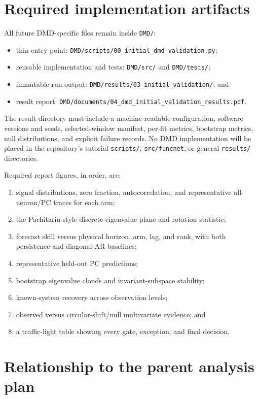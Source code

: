 \documentclass[11pt,a4paper]{article}
\begin{document}
\section{Required implementation artifacts}

All future DMD-specific files remain inside \texttt{DMD/}:

\begin{itemize}
  \item thin entry point: \texttt{DMD/scripts/00\_initial\_dmd\_validation.py};
  \item reusable implementation and tests: \texttt{DMD/src/} and
  \texttt{DMD/tests/};
  \item immutable run output: \texttt{DMD/results/03\_initial\_validation/}; and
  \item result report: \texttt{DMD/documents/04\_dmd\_initial\_validation\_results.pdf}.
\end{itemize}

The result directory must include a machine-readable configuration, software
versions and seeds, selected-window manifest, per-fit metrics, bootstrap metrics,
null distributions, and explicit failure records. No DMD implementation will be
placed in the repository's tutorial \texttt{scripts/}, \texttt{src/funcnet}, or
general \texttt{results/} directories.

Required report figures, in order, are:

\begin{enumerate}
  \item signal distributions, zero fraction, autocorrelation, and representative
  all-neuron/PC traces for each arm;
  \item the Pachitariu-style discrete-eigenvalue plane and rotation statistic;
  \item forecast skill versus physical horizon, arm, lag, and rank, with both
  persistence and diagonal-AR baselines;
  \item representative held-out PC predictions;
  \item bootstrap eigenvalue clouds and invariant-subspace stability;
  \item known-system recovery across observation levels;
  \item observed versus circular-shift/null multivariate evidence; and
  \item a traffic-light table showing every gate, exception, and final decision.
\end{enumerate}

\section{Relationship to the parent analysis plan}
\end{document}
